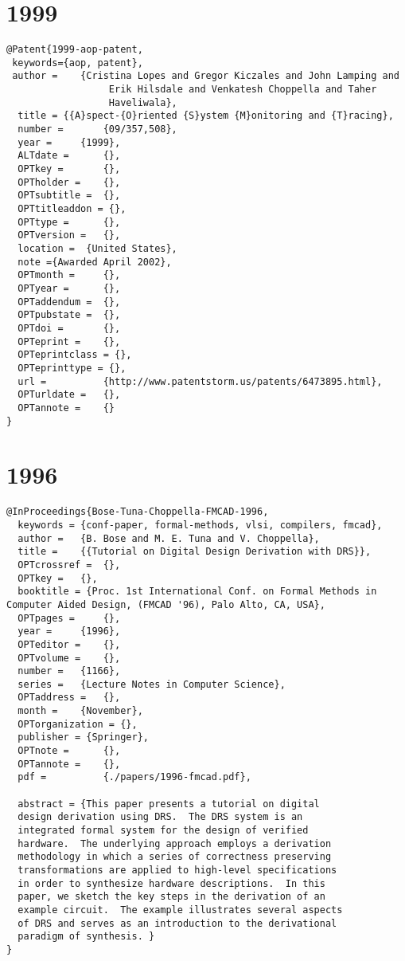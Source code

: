 \documentclass[11pt]{article}
\begin{document}
\section{1999}
\label{sec:org7c404b0}
\lstset{language=bibtex,label= ,caption= ,captionpos=b,numbers=none}
\begin{lstlisting}
@Patent{1999-aop-patent,
 keywords={aop, patent},
 author = 	 {Cristina Lopes and Gregor Kiczales and John Lamping and
                  Erik Hilsdale and Venkatesh Choppella and Taher
                  Haveliwala},
  title = {{A}spect-{O}riented {S}ystem {M}onitoring and {T}racing},
  number = 		 {09/357,508},
  year = 	 {1999},
  ALTdate = 	 {},
  OPTkey = 		 {},
  OPTholder = 	 {},
  OPTsubtitle =  {},
  OPTtitleaddon = {},
  OPTtype = 	 {},
  OPTversion = 	 {},
  location =  {United States},
  note ={Awarded April 2002},  
  OPTmonth = 	 {},
  OPTyear = 	 {},
  OPTaddendum =  {},
  OPTpubstate =  {},
  OPTdoi = 		 {},
  OPTeprint = 	 {},
  OPTeprintclass = {},
  OPTeprinttype = {},
  url = 		 {http://www.patentstorm.us/patents/6473895.html},
  OPTurldate = 	 {},
  OPTannote = 	 {}
}
\end{lstlisting}
\section{1996}
\label{sec:orga4b87d7}
\lstset{language=bibtex,label= ,caption= ,captionpos=b,numbers=none}
\begin{lstlisting}
@InProceedings{Bose-Tuna-Choppella-FMCAD-1996,
  keywords = {conf-paper, formal-methods, vlsi, compilers, fmcad},
  author = 	 {B. Bose and M. E. Tuna and V. Choppella},
  title = 	 {{Tutorial on Digital Design Derivation with DRS}},
  OPTcrossref =  {},
  OPTkey = 	 {},
  booktitle = {Proc. 1st International Conf. on Formal Methods in Computer Aided Design, (FMCAD '96), Palo Alto, CA, USA},
  OPTpages = 	 {},
  year = 	 {1996},
  OPTeditor = 	 {},
  OPTvolume = 	 {},
  number = 	 {1166},
  series = 	 {Lecture Notes in Computer Science},
  OPTaddress = 	 {},
  month = 	 {November},
  OPTorganization = {},
  publisher = {Springer},
  OPTnote = 	 {},
  OPTannote = 	 {},
  pdf =          {./papers/1996-fmcad.pdf},

  abstract = {This paper presents a tutorial on digital
  design derivation using DRS.  The DRS system is an
  integrated formal system for the design of verified
  hardware.  The underlying approach employs a derivation
  methodology in which a series of correctness preserving
  transformations are applied to high-level specifications
  in order to synthesize hardware descriptions.  In this
  paper, we sketch the key steps in the derivation of an
  example circuit.  The example illustrates several aspects
  of DRS and serves as an introduction to the derivational
  paradigm of synthesis. }
} 
\end{lstlisting}
\end{document}
